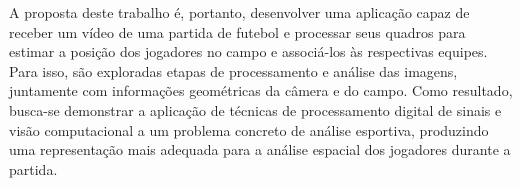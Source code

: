 A proposta deste trabalho é, portanto, desenvolver uma aplicação capaz de receber um vídeo de uma partida de futebol e processar seus quadros para estimar a posição dos jogadores no campo e associá-los às respectivas equipes. Para isso, são exploradas etapas de processamento e análise das imagens, juntamente com informações geométricas da câmera e do campo. Como resultado, busca-se demonstrar a aplicação de técnicas de processamento digital de sinais e visão computacional a um problema concreto de análise esportiva, produzindo uma representação mais adequada para a análise espacial dos jogadores durante a partida.\\